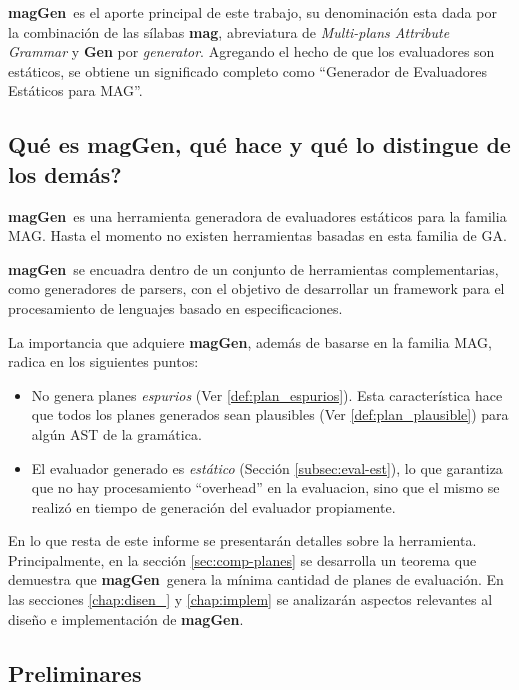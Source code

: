 \documentclass[runningheads,a4paper]{llncs}
\newcommand{\maggen}{\textbf{magGen}}
\begin{document}

\maggen\ es el aporte principal de este trabajo, su denominación esta dada por la combinación de las sílabas \textbf{mag}, abreviatura de \textit{Multi-plans Attribute Grammar} y \textbf{Gen} por \textit{generator}. Agregando el hecho de que los evaluadores son estáticos, se obtiene un significado completo como ``Generador de Evaluadores Estáticos para MAG''.

\subsection{\textquestiondown Qué es \maggen, qué hace y qué lo distingue de los demás?}

\maggen\ es una herramienta generadora de evaluadores estáticos para la familia MAG. Hasta el momento no existen herramientas basadas en esta familia de GA. 

\maggen\ se encuadra dentro de un conjunto de herramientas complementarias, como generadores de parsers, con el objetivo de desarrollar un framework para el procesamiento de lenguajes basado en especificaciones.

La importancia que adquiere \maggen, además de basarse en la familia MAG, radica en los siguientes puntos: 
\begin{itemize}
 \item No genera planes \textit{espurios} (Ver \ref{def:plan_espurios}). Esta característica hace que todos los planes generados sean plausibles (Ver \ref{def:plan_plausible}) para algún AST de la gramática.
 
 \item El evaluador generado es \textit{estático} (Sección \ref{subsec:eval-est}), lo que garantiza que no hay procesamiento ``overhead'' en la evaluacion, sino que el mismo se realizó en tiempo de generación del evaluador propiamente.
\end{itemize}

En lo que resta de este informe se presentarán detalles sobre la herramienta. Principalmente, en la sección \ref{sec:comp-planes} se desarrolla un teorema que demuestra que \maggen\ genera la mínima cantidad de planes de evaluación. En las secciones \ref{chap:disen_} y \ref{chap:implem} se analizarán aspectos relevantes al diseño e implementación de \maggen.

\subsection{Preliminares}
\end{document}
